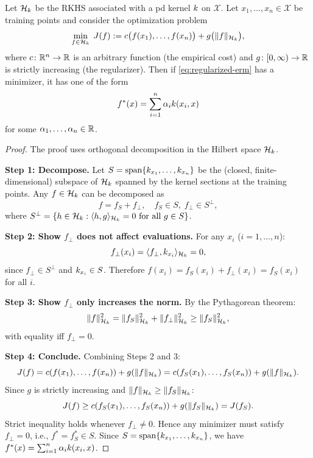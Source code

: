 \documentclass[11pt,a4paper]{article}
\begin{document}
\begin{theorem}
\label{thm:representer}
Let $\mathcal{H}_k$ be the RKHS associated with a pd kernel $k$ on
$\mathcal{X}$. Let $x_1, \ldots, x_n \in \mathcal{X}$ be training
points and consider the optimization problem
\begin{equation}
\label{eq:regularized-erm}
\min_{f \in \mathcal{H}_k} \; J(f) := c\bigl(f(x_1), \ldots, f(x_n)\bigr)
+ g\bigl(\|f\|_{\mathcal{H}_k}\bigr),
\end{equation}
where $c \colon \mathbb{R}^n \to \mathbb{R}$ is an arbitrary function (the empirical
cost) and $g \colon [0, \infty) \to \mathbb{R}$ is strictly increasing (the
regularizer). Then if \eqref{eq:regularized-erm} has a minimizer,
it has one of the form
\begin{equation}
\label{eq:representer-form}
f^*(x) = \sum_{i=1}^n \alpha_i k(x_i, x)
\end{equation}
for some $\alpha_1, \ldots, \alpha_n \in \mathbb{R}$.
\end{theorem}

\begin{proof}
The proof uses orthogonal decomposition in the Hilbert space $\mathcal{H}_k$.

\textbf{Step 1: Decompose.} Let $S = \operatorname{span}\{k_{x_1}, \ldots,
k_{x_n}\}$ be the (closed, finite-dimensional) subspace of
$\mathcal{H}_k$ spanned by the kernel sections at the training points.
Any $f \in \mathcal{H}_k$ can be decomposed as
\[
f = f_S + f_\perp, \quad f_S \in S, \; f_\perp \in S^\perp,
\]
where $S^\perp = \{h \in \mathcal{H}_k : \langle h, g \rangle_{\mathcal{H}_k} = 0
\text{ for all } g \in S\}$.

\textbf{Step 2: Show $f_\perp$ does not affect evaluations.}
For any $x_i$ ($i = 1, \ldots, n$):
\[
f_\perp(x_i) = \langle f_\perp, k_{x_i} \rangle_{\mathcal{H}_k} = 0,
\]
since $f_\perp \in S^\perp$ and $k_{x_i} \in S$. Therefore
$f(x_i) = f_S(x_i) + f_\perp(x_i) = f_S(x_i)$ for all $i$.

\textbf{Step 3: Show $f_\perp$ only increases the norm.}
By the Pythagorean theorem:
\[
\|f\|_{\mathcal{H}_k}^2 = \|f_S\|_{\mathcal{H}_k}^2 + \|f_\perp\|_{\mathcal{H}_k}^2
\ge \|f_S\|_{\mathcal{H}_k}^2,
\]
with equality iff $f_\perp = 0$.

\textbf{Step 4: Conclude.} Combining Steps 2 and 3:
\[
J(f) = c(f(x_1), \ldots, f(x_n)) + g(\|f\|_{\mathcal{H}_k})
= c(f_S(x_1), \ldots, f_S(x_n)) + g(\|f\|_{\mathcal{H}_k}).
\]
Since $g$ is strictly increasing and $\|f\|_{\mathcal{H}_k} \ge
\|f_S\|_{\mathcal{H}_k}$:
\[
J(f) \ge c(f_S(x_1), \ldots, f_S(x_n)) + g(\|f_S\|_{\mathcal{H}_k})
= J(f_S).
\]
Strict inequality holds whenever $f_\perp \ne 0$. Hence any
minimizer must satisfy $f_\perp = 0$, i.e., $f^* = f_S^* \in S$.
Since $S = \operatorname{span}\{k_{x_1}, \ldots, k_{x_n}\}$, we have
$f^*(x) = \sum_{i=1}^n \alpha_i k(x_i, x)$.
\end{proof}
\end{document}

